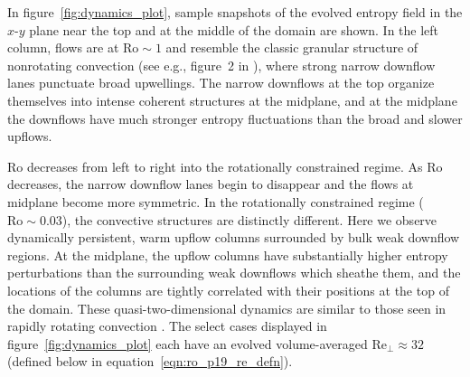 In figure~\ref{fig:dynamics_plot}, sample snapshots of the evolved entropy field 
in the $x$-$y$ plane near the top and at the middle of the domain are shown. 
In the left column, flows are at $\text{Ro} \sim 1$ and resemble the classic granular structure 
of nonrotating convection (see e.g., figure~2 in \AB), where strong narrow downflow lanes 
punctuate broad upwellings. The narrow downflows at the top organize themselves into intense
coherent structures at the midplane, and at the midplane the downflows have much stronger
entropy fluctuations than the broad and slower upflows. 

Ro decreases from left to right into the rotationally constrained 
regime. As Ro decreases, the narrow downflow lanes begin to disappear
and the flows at midplane become more symmetric. In the rotationally constrained regime ($\text{Ro} \sim 0.03$), 
the convective structures are distinctly different. 
Here we observe dynamically persistent, warm upflow columns 
surrounded by bulk weak downflow regions. At the midplane, the upflow columns have substantially
higher entropy perturbations than the surrounding weak downflows which sheathe them, 
and the locations of the columns
are tightly correlated with their positions at the top of the domain. These quasi-two-dimensional 
dynamics are similar to those seen in rapidly 
rotating \RB convection \citep[e.g.,][]{stellmach&all2014}. 
The select cases displayed in figure~\ref{fig:dynamics_plot} each have an evolved volume-averaged
$\text{Re}_{\perp} \approx 32$ (defined below in equation~\ref{eqn:ro_p19_re_defn}).

